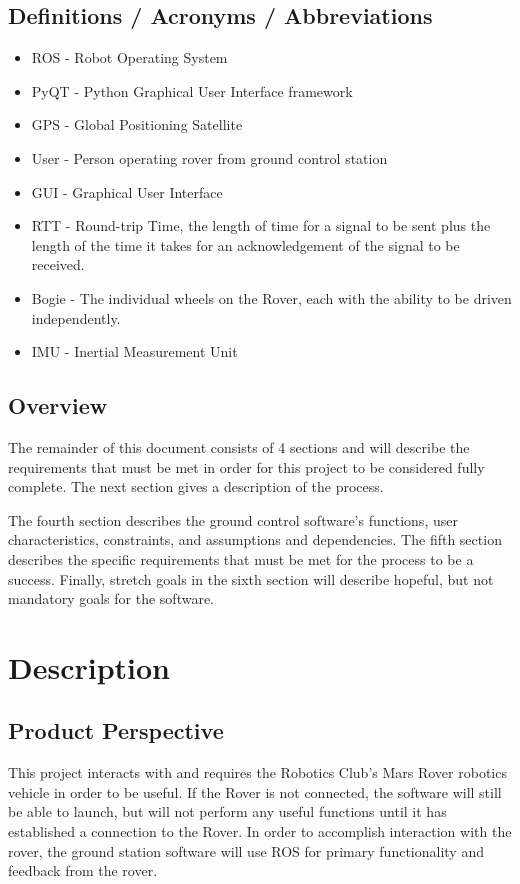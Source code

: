 \documentclass[onecolumn, draftclsnofoot, 10pt, compsoc]{IEEEtran}
\begin{document}
\subsection{Definitions / Acronyms / Abbreviations}
\begin{itemize}
\item ROS - Robot Operating System
\item PyQT - Python Graphical User Interface framework
\item GPS - Global Positioning Satellite 
\item User - Person operating rover from ground control station
\item GUI - Graphical User Interface
\item RTT - Round-trip Time, the length of time for a signal to be sent plus the length of the time it takes for an acknowledgement of the signal to be received.
\item Bogie - The individual wheels on the Rover, each with the ability to be driven independently.
\item IMU - Inertial Measurement Unit
\end{itemize}
\subsection{Overview}
The remainder of this document consists of 4 sections and will describe the requirements that must be met in order for this project to be considered fully complete. The next section gives a description of the process. 

The fourth section describes the ground control software's functions, user characteristics, constraints, and assumptions and dependencies. 
The fifth section describes the specific requirements that must be met for the process to be a success.
Finally, stretch goals in the sixth section will describe hopeful, but not mandatory goals for the software.

\section{Description}
\subsection{Product Perspective}
This project interacts with and requires the Robotics Club's Mars Rover robotics vehicle in order to be useful.
If the Rover is not connected, the software will still be able to launch, but will not perform any useful functions until it has established a connection to the Rover.
In order to accomplish interaction with the rover, the ground station software will use ROS for primary functionality and feedback from the rover.
\end{document}
